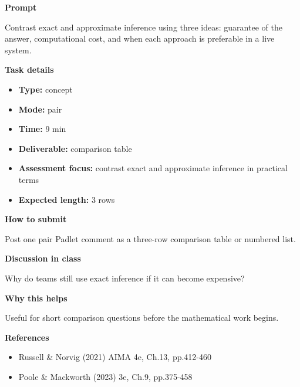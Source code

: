 \documentclass[11pt]{article}
\begin{document}
\begin{tcolorbox}[colback=white,colframe=MidnightBlue,title={Q1 Core Concept Check},fonttitle=\bfseries,breakable]
\begin{center}
\end{center}

{\large\bfseries\color{MidnightBlue} Prompt}\par\medskip
Contrast exact and approximate inference using three ideas: guarantee of the answer, computational cost, and when each approach is preferable in a live system.

{\large\bfseries\color{MidnightBlue} Task details}\par\medskip
\begin{itemize}\item \textbf{Type:} concept
\item \textbf{Mode:} pair
\item \textbf{Time:} 9 min
\item \textbf{Deliverable:} comparison table
\item \textbf{Assessment focus:} contrast exact and approximate inference in practical terms
\item \textbf{Expected length:} 3 rows\end{itemize}

{\large\bfseries\color{MidnightBlue} How to submit}\par\medskip
Post one pair Padlet comment as a three-row comparison table or numbered list.

{\large\bfseries\color{MidnightBlue} Discussion in class}\par\medskip
Why do teams still use exact inference if it can become expensive?

{\large\bfseries\color{MidnightBlue} Why this helps}\par\medskip
Useful for short comparison questions before the mathematical work begins.

{\large\bfseries\color{MidnightBlue} References}\par\medskip
\begin{itemize}\item Russell \& Norvig (2021) AIMA 4e, Ch.13, pp.412-460
\item Poole \& Mackworth (2023) 3e, Ch.9, pp.375-458\end{itemize}
\end{tcolorbox}
\end{document}
